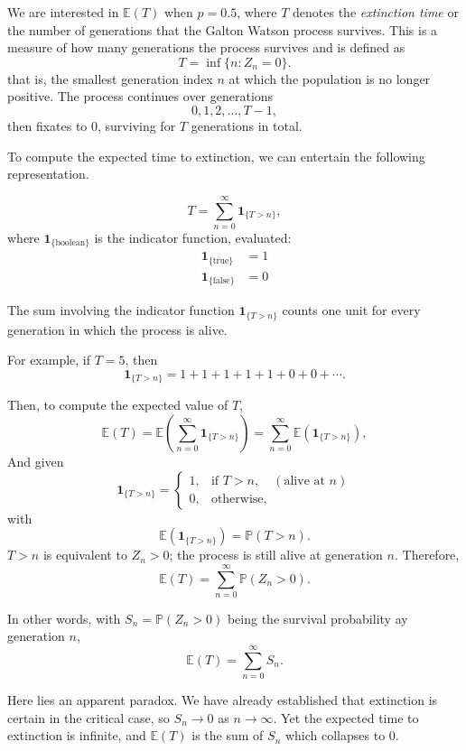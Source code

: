 \documentclass[11pt]{article}
\begin{document}
We are interested in $\mathbb{E}(T)$ when $p = 0.5$, where $T$ denotes the
\emph{extinction time} or the number of generations that the Galton Watson process survives. This is a measure of how many generations the process
survives and is defined as
\[
T = \inf \{ n : Z_n = 0 \}.
\]
that is, the smallest generation index $n$ at which the population is no longer positive.
The process continues over generations
\[
0, 1, 2, \dots, T-1,
\]
then fixates to 0, surviving for $T$ generations in total.

To compute the expected time to extinction, we can entertain the following representation.

\[
T = \sum_{n=0}^{\infty} \mathbf{1}_{\{ T > n \}},
\]
where $\mathbf{1}_{\{\text{boolean}\}}$ is the indicator function, evaluated:
\begin{align*}
    \mathbf{1}_{\{ \text{true}\}} &= 1 \\
    \mathbf{1}_{\{ \text{false}\}} &= 0
\end{align*}



\noindent
The sum involving the indicator function $\mathbf{1}_{\{T>n\}}$ counts one unit
for every generation in which the process is alive.

For example, if $T = 5$, then
\[
\mathbf{1}_{\{T>n\}} = 1 + 1 + 1 + 1 + 1 + 0 + 0 + \cdots .
\]

\noindent
Then, to compute the expected value of $T$,
\[
\mathbb{E}(T)
= \mathbb{E}\!\left( \sum_{n=0}^{\infty} \mathbf{1}_{\{T>n\} } \right)
= \sum_{n=0}^{\infty} \mathbb{E}\!\left( \mathbf{1}_{\{T>n\}} \right),
\]
And given
\[
\mathbf{1}_{\{T>n\}} =
\begin{cases} 
1, & \text{if } T>n, \quad(\text{alive at } n) \\
0, & \text{otherwise},
\end{cases}
\]
with
\[
\mathbb{E}\!\left( \mathbf{1}_{\{T>n\}} \right)
= \mathbb{P}(T>n).
\]
\noindent
$T>n$ is equivalent to $Z_n>0$; the process is still
alive at generation $n$. Therefore,
\[
\mathbb{E}(T)
= \sum_{n=0}^{\infty} \mathbb{P}(Z_n>0).
\]

\noindent
In other words, with $S_n = \mathbb{P}(Z_n>0)$ being the survival probability ay generation $n$,
\[
\mathbb{E}(T) = \sum_{n=0}^{\infty} S_n.
\]

\noindent
Here lies an apparent paradox. We have already established that extinction is certain in the critical case, so $S_n \to 0$ as $n \to \infty$.
Yet the expected time to extinction is infinite, and $\mathbb{E}(T)$ is the sum of $S_n$ which collapses to 0.
\end{document}
